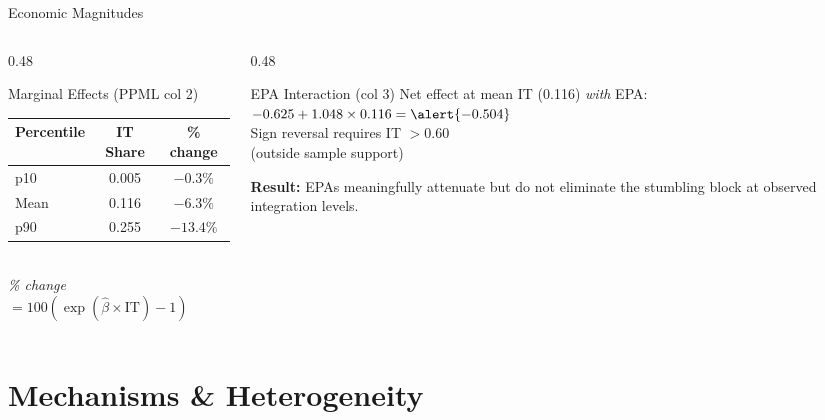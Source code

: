 \documentclass[aspectratio=169,11pt]{beamer}
\begin{document}
\begin{frame}{Economic Magnitudes}

    \begin{columns}[T]
        \begin{column}{0.48\textwidth}
            \begin{block}{Marginal Effects (PPML col 2)}
                \begin{tabular}{lcc}
                    \toprule
                    Percentile & IT Share & \% change \\
                    \midrule
                    p10   & 0.005 & $-0.3\%$  \\
                    Mean  & 0.116 & \alert{$-6.3\%$}  \\
                    p90   & 0.255 & \alert{$-13.4\%$} \\
                    \bottomrule
                \end{tabular}\\[4pt]
                \small\textit{\% change $= 100(\exp(\hat\beta \times \text{IT}) - 1)$}
            \end{block}
        \end{column}
        \begin{column}{0.48\textwidth}
            \begin{block}{EPA Interaction (col 3)}
                Net effect at mean IT (0.116) \emph{with} EPA:\\[4pt]
                $-0.625 + 1.048 \times 0.116 = \alert{-0.504}$\\[6pt]
                Sign reversal requires IT $> 0.60$\\
                (outside sample support)
            \end{block}
            \medskip
            \small \textbf{Result:} EPAs meaningfully attenuate but do not eliminate the
            stumbling block at observed integration levels.
        \end{column}
    \end{columns}

\end{frame}

\section{Mechanisms \& Heterogeneity}
\end{document}
